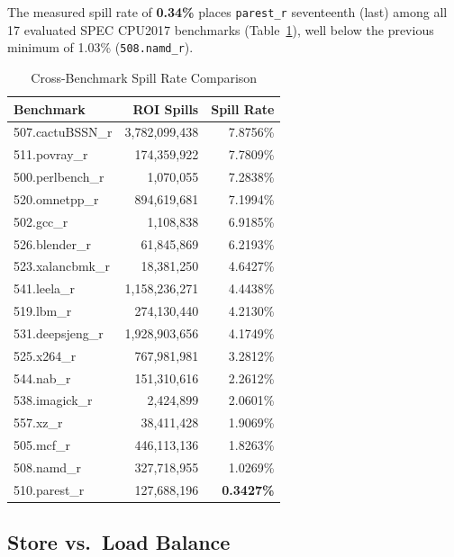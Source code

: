 \documentclass[conference]{IEEEtran}
\begin{document}
The measured spill rate of \textbf{0.34\%} places
\texttt{parest\_r} seventeenth (last) among all 17 evaluated SPEC
CPU2017 benchmarks (Table~\ref{tab:compare}), well below the
previous minimum of 1.03\% (\texttt{508.namd\_r}).

\begin{table}[H]
\centering
\caption{Cross-Benchmark Spill Rate Comparison}
\label{tab:compare}
\begin{tabular}{lrr}
\toprule
\textbf{Benchmark} & \textbf{ROI Spills} & \textbf{Spill Rate} \\
\midrule
507.cactuBSSN\_r & 3,782,099,438 & 7.8756\% \\
511.povray\_r    &   174,359,922 & 7.7809\% \\
500.perlbench\_r &     1,070,055 & 7.2838\% \\
520.omnetpp\_r   &   894,619,681 & 7.1994\% \\
502.gcc\_r       &     1,108,838 & 6.9185\% \\
526.blender\_r   &    61,845,869 & 6.2193\% \\
523.xalancbmk\_r &    18,381,250 & 4.6427\% \\
541.leela\_r     & 1,158,236,271 & 4.4438\% \\
519.lbm\_r       &   274,130,440 & 4.2130\% \\
531.deepsjeng\_r & 1,928,903,656 & 4.1749\% \\
525.x264\_r      &   767,981,981 & 3.2812\% \\
544.nab\_r       &   151,310,616 & 2.2612\% \\
538.imagick\_r   &     2,424,899 & 2.0601\% \\
557.xz\_r        &    38,411,428 & 1.9069\% \\
505.mcf\_r       &   446,113,136 & 1.8263\% \\
508.namd\_r      &   327,718,955 & 1.0269\% \\
510.parest\_r    &   127,688,196 & \textbf{0.3427\%} \\
\bottomrule
\end{tabular}
\end{table}

\subsection{Store vs.\ Load Balance}
\end{document}
